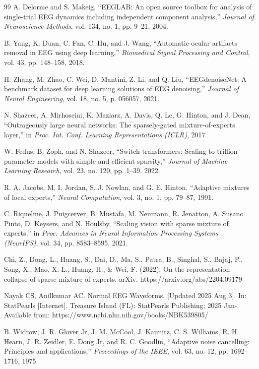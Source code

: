 \documentclass{article}
\begin{document}
\begin{thebibliography}{99}
A. Delorme and S. Makeig, ``EEGLAB: An open source toolbox for analysis of single-trial EEG dynamics including independent component analysis,'' \textit{Journal of Neuroscience Methods}, vol. 134, no. 1, pp. 9--21, 2004.

B. Yang, K. Duan, C. Fan, C. Hu, and J. Wang, ``Automatic ocular artifacts removal in EEG using deep learning,'' \textit{Biomedical Signal Processing and Control}, vol. 43, pp. 148--158, 2018.

H. Zhang, M. Zhao, C. Wei, D. Mantini, Z. Li, and Q. Liu, ``EEGdenoiseNet: A benchmark dataset for deep learning solutions of EEG denoising,'' \textit{Journal of Neural Engineering}, vol. 18, no. 5, p. 056057, 2021.

N. Shazeer, A. Mirhoseini, K. Maziarz, A. Davis, Q. Le, G. Hinton, and J. Dean, ``Outrageously large neural networks: The sparsely-gated mixture-of-experts layer,'' in \textit{Proc. Int. Conf. Learning Representations (ICLR)}, 2017.

W. Fedus, B. Zoph, and N. Shazeer, ``Switch transformers: Scaling to trillion parameter models with simple and efficient sparsity,'' \textit{Journal of Machine Learning Research}, vol. 23, no. 120, pp. 1--39, 2022.

R. A. Jacobs, M. I. Jordan, S. J. Nowlan, and G. E. Hinton, ``Adaptive mixtures of local experts,'' \textit{Neural Computation}, vol. 3, no. 1, pp. 79--87, 1991.

C. Riquelme, J. Puigcerver, B. Mustafa, M. Neumann, R. Jenatton, A. Susano Pinto, D. Keysers, and N. Houlsby, ``Scaling vision with sparse mixture of experts,'' in \textit{Proc. Advances in Neural Information Processing Systems (NeurIPS)}, vol. 34, pp. 8583--8595, 2021.

Chi, Z., Dong, L., Huang, S., Dai, D., Ma, S., Patra, B., Singhal, S., Bajaj, P., Song, X., Mao, X.-L., Huang, H., $\&$ Wei, F. (2022). On the representation collapse of sparse mixture of experts. arXiv. https://arxiv.org/abs/2204.09179

Nayak CS, Anilkumar AC. Normal EEG Waveforms. [Updated 2025 Aug 3]. In: StatPearls [Internet]. Treasure Island (FL): StatPearls Publishing; 2025 Jan-. Available from: https://www.ncbi.nlm.nih.gov/books/NBK539805/

B. Widrow, J. R. Glover Jr, J. M. McCool, J. Kaunitz, C. S. Williams, R. H. Hearn, J. R. Zeidler, E. Dong Jr, and R. C. Goodlin, ``Adaptive noise cancelling: Principles and applications,'' \textit{Proceedings of the IEEE}, vol. 63, no. 12, pp. 1692--1716, 1975.


\end{thebibliography}
\end{document}
